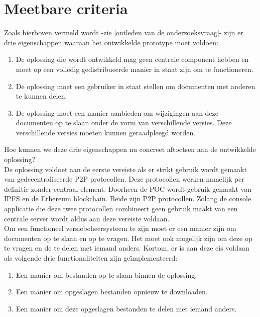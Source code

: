 \section{Meetbare criteria}
Zoals hierboven vermeld wordt -zie \ref{ontleden van de onderzoeksvraag}- zijn er drie eigenschappen waaraan het ontwikkelde prototype moet voldoen:

\begin{enumerate}
	\item De oplossing die wordt ontwikkeld mag geen centrale component hebben en moet op een volledig gedistribueerde manier in staat zijn om te functioneren.
	\item De oplossing moet een gebruiker in staat stellen om documenten met anderen te kunnen delen.
	\item De oplossing moet een manier aanbieden om wijzigingen aan deze documenten op te slaan onder de vorm van verschillende versies. Deze verschillende versies moeten kunnen geraadpleegd worden.
\end{enumerate}

Hoe kunnen we deze drie eigenschappen nu concreet aftoetsen aan de ontwikkelde oplossing?\\

De oplossing voldoet aan de eerste vereiste als er strikt gebruik wordt gemaakt van gedecentraliseerde P2P protocollen. Deze protocollen werken namelijk per definitie zonder centraal element. Doorheen de POC wordt gebruik gemaakt van IPFS en de Ethereum blockchain. Beide zijn P2P protocollen. Zolang de console applicatie die deze twee protocollen combineert geen gebruik maakt van een centrale server wordt aldus aan deze vereiste voldaan.\\

Om een functioneel versiebeheersysteem te zijn moet er een manier zijn om documenten op te slaan en op te vragen. Het moet ook mogelijk zijn om deze op te vragen en de te delen met iemand anders. Kortom, er is aan deze eis voldaan als volgende drie functionaliteiten zijn geïmplementeerd:

\begin{enumerate}
\item Een manier om bestanden op te slaan binnen de oplossing.
\item Een manier om opgeslagen bestanden opnieuw te downloaden.
\item Een manier om deze opgeslagen bestanden te delen met iemand anders.
\end{enumerate}


